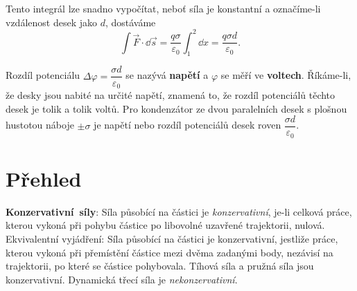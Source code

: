 {    Tento integrál lze snadno vypočítat, neboť síla je konstantní a označíme-li vzdálenost desek 
    jako \(d\), dostáváme
    \begin{equation}\label{FYZ:eq014}
      \int\vec{F}\cdot\dd{\vec{s}} = \frac{q\sigma}{\varepsilon_0}\int_1^2\dd{x} 
                                   = \frac{q\sigma d}{\varepsilon_0}.
    \end{equation}
    
    Rozdíl potenciálu \(\Delta\varphi = \dfrac{\sigma d}{\varepsilon_0}\) se nazývá \textbf{napětí} 
    a \(\varphi\) se měří ve \textbf{voltech}. Říkáme-li, že desky jsou nabité na určité napětí, 
    znamená to, že rozdíl potenciálů těchto desek je tolik a tolik voltů. Pro kondenzátor ze dvou 
    paralelních desek s plošnou hustotou náboje \(\pm\sigma\) je napětí nebo rozdíl potenciálů 
    desek roven \(\dfrac{\sigma d}{\varepsilon_0}\).
    
  \section{Přehled}
    \mbox{\textbf{Konzervativní síly}}: Síla působící na částici je \emph{konzervativní}, je-li 
    celková práce, kterou vykoná při pohybu částice po libovolné uzavřené trajektorii, nulová. 
    Ekvivalentní vyjádření: Síla působící na částici je konzervativní, jestliže práce, kterou 
    vykoná při přemístění částice mezi dvěma zadanými body, nezávisí na trajektorii, po které se
    částice pohybovala. Tíhová síla a pružná síla jsou konzervativní. Dynamická třecí síla je 
    \emph{nekonzervativní}.
    
} %
\printbibliography[heading=subbibliography]
